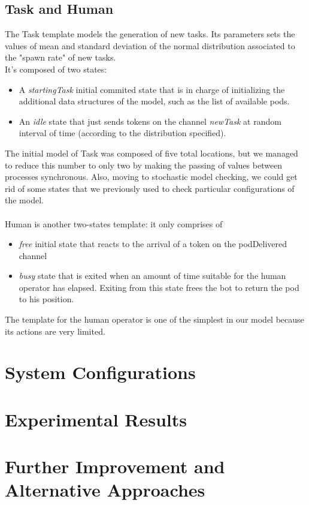 \documentclass[10pt,a4paper]{article}
\begin{document}
		\subsection{Task and Human}
			The Task template models the generation of new tasks. Its parameters sets the values of mean and standard deviation of the normal distribution associated to the "spawn rate" of new tasks.\\
			It's composed of two states:
			\begin{itemize}
				\item A \emph{startingTask} initial commited state that is in charge of initializing the additional data structures of the model, such as the list of available pods.
				\item An \emph{idle} state that just sends tokens on the channel \emph{newTask} at random interval of time (according to the distribution specified).
			\end{itemize}
			The initial model of Task was composed of five total locations, but we managed to reduce this number to only two by making the passing of values between processes synchronous. Also, moving to stochastic model checking, we could get rid of some states that we previously used to check particular configurations of the model.
			\\\\
			Human is another two-states template: it only comprises of
			\begin{itemize}
				\item \emph{free} initial state that reacts to the arrival of a token on the podDelivered channel
				\item \emph{busy} state that is exited when an amount of time suitable for the human operator has elapsed. Exiting from this state frees the bot to return the pod to his position.
			\end{itemize}
			The template for the human operator is one of the simplest in our model because its actions are very limited. 
			
	
	\section{System Configurations}
	
	\section{Experimental Results}
	
	\section{Further Improvement and Alternative Approaches}
	
	
\end{document}
